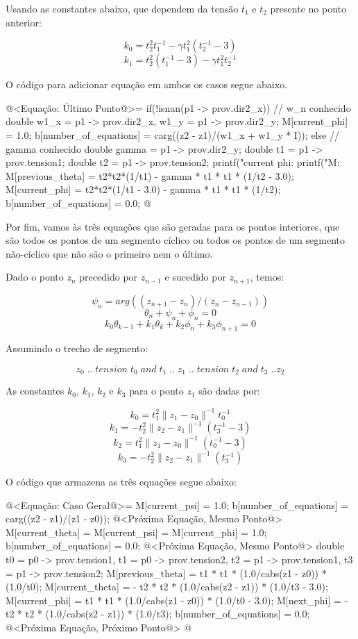 Usando as constantes abaixo, que dependem da tensão $t_1$ e $t_2$
presente no ponto anterior:

$$
k_0=t_2^2t_1^{-1}-\gamma t_1^2(t_2^{-1}-3)
$$
$$
k_1=t_2^2(t_1^{-1}-3)-\gamma t_1^2t_2^{-1}
$$

O código para adicionar equação em ambos os casos segue abaixo.

\iniciocodigo
@<Equação: Último Ponto@>=
if(!isnan(p1 -> prov.dir2_x)){ // w_n conhecido
  double w1_x = p1 -> prov.dir2_x, w1_y = p1 -> prov.dir2_y;
  M[current_phi] = 1.0;
  b[number_of_equations] = carg((z2 - z1)/(w1_x + w1_y * I));
}
else{ // gamma conhecido
  double gamma = p1 -> prov.dir2_y;
  double t1 = p1 -> prov.tension1;
  double t2 = p1 -> prov.tension2;
  printf("current phi: %
  printf("M: %
  M[previous_theta] = t2*t2*(1/t1) - gamma * t1 * t1 * (1/t2 - 3.0);
  M[current_phi] = t2*t2*(1/t1 - 3.0) - gamma * t1 * t1 * (1/t2);
  b[number_of_equations] = 0.0;
}
@
\fimcodigo

Por fim, vamos às três equações que são geradas para os pontos
interiores, que são todos os pontos de um segmento cíclico ou todos os
pontos de um segmento não-cíclico que não são o primeiro nem o último.

Dado o ponto $z_n$ precedido por $z_{n-1}$ e sucedido por $z_{n+1}$,
temos:

$$
\psi_n = arg((z_{n+1}-z_n)/(z_n-z_{n-1}))
$$
$$
\theta_n + \psi_n + \phi_n = 0
$$
$$
k_0\theta_{k-1} + k_1\theta_k + k_2\phi_n + k_3\phi_{n+1} = 0
$$

Assumindo o trecho de segmento:

$$
z_0\; ..\; tension\; t_0\; and\; t_1\; ..\; z_1\; ..\; tension\; t_2\; and\; t_3
\; .. z_2
$$

As constantes $k_0$, $k_1$, $k_2$ e $k_3$ para o ponto $z_1$ são dadas por:

$$
k_0 = t_1^2\|z_1-z_0\|^{-1}t_0^{-1}
$$
$$
k_1 = - t_2^2\|z_2-z_1\|^{-1}(t_3^{-1}-3)
$$
$$
k_2 = t_1^2\|z_1-z_0\|^{-1}(t_0^{-1} - 3)
$$
$$
k_3 = - t_2^2\|z_2-z_1\|^{-1}(t_3^{-1})
$$

O código que armazena as três equações segue abaixo:

\iniciocodigo
@<Equação: Caso Geral@>=
M[current_psi] = 1.0;
b[number_of_equations] = carg((z2 - z1)/(z1 - z0));
@<Próxima Equação, Mesmo Ponto@>
M[current_theta] = M[current_psi] = M[current_phi] = 1.0;
b[number_of_equations] = 0.0;
@<Próxima Equação, Mesmo Ponto@>
{
  double t0 = p0 -> prov.tension1, t1 = p0 -> prov.tension2,
         t2 = p1 -> prov.tension1, t3 = p1 -> prov.tension2;
  M[previous_theta] = t1 * t1 * (1.0/cabs(z1 - z0)) * (1.0/t0);
  M[current_theta] = - t2 * t2 * (1.0/cabs(z2 - z1)) * (1.0/t3 - 3.0);
  M[current_phi] = t1 * t1 * (1.0/cabs(z1 - z0)) * (1.0/t0 - 3.0);
  M[next_phi] = - t2 * t2 * (1.0/cabs(z2 - z1)) * (1.0/t3);
  b[number_of_equations] = 0.0;
  @<Próxima Equação, Próximo Ponto@>
}
@
\fimcodigo

